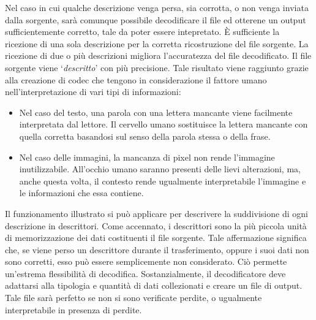 Nel caso in cui qualche descrizione venga persa, sia corrotta, o non venga
inviata dalla sorgente, sarà comunque possibile decodificare il file ed
otterene un output sufficientemente corretto, tale da poter essere intepretato. \`E sufficiente la ricezione di una sola descrizione per la corretta ricostruzione del file sorgente. La ricezione di due o più descrizioni migliora l'accuratezza del file decodificato. Il file sorgente viene `\emph{descritto}' con più precisione.  Tale risultato viene raggiunto grazie alla creazione di codec che tengono in considerazione il fattore umano nell'interpretazione di vari tipi di informazioni:
\begin{itemize}
 \item Nel caso del testo, una parola con una lettera mancante viene facilmente interpretata dal lettore. Il cervello umano sostituisce la lettera mancante con quella corretta basandosi sul senso della parola stessa o della frase.
 \item Nel caso delle immagini, la mancanza di pixel non rende l'immagine inutilizzabile. All'occhio umano saranno presenti delle lievi alterazioni, ma, anche questa volta, il contesto rende ugualmente interpretabile l'immagine e le informazioni che essa contiene.
\end{itemize}
Il funzionamento illustrato si può applicare per descrivere la suddivisione di
ogni descrizione in descrittori. Come accennato, i descrittori sono la più
piccola unità di memorizzazione dei dati costituenti il file sorgente. Tale
affermazione significa che, se viene perso un descrittore durante il
trasferimento, oppure i suoi dati non sono corretti, esso può essere
semplicemente non considerato. Ciò permette un'estrema flessibilità di
decodifica. Sostanzialmente, il decodificatore deve adattarsi alla tipologia e
quantità di dati collezionati e creare un file di output. Tale file sarà perfetto se non si sono verificate perdite, o ugualmente interpretabile in presenza di perdite.
